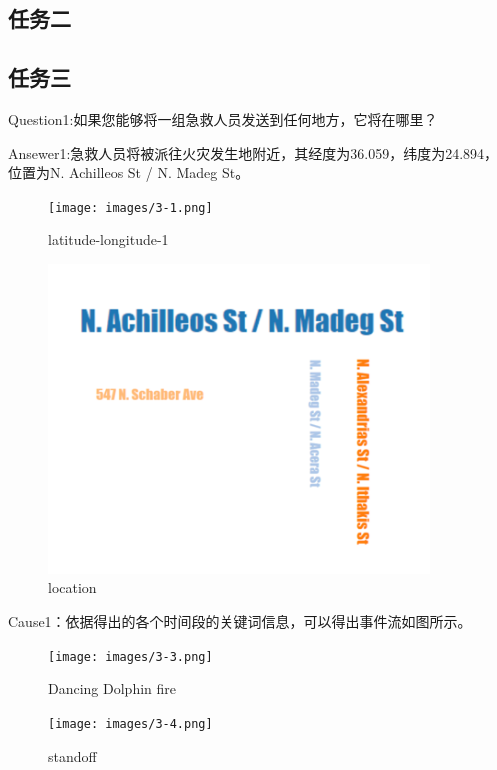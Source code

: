 \documentclass[a4paper]{article}
\begin{document}
\subsection{任务二}
\subsection{任务三}
Question1:如果您能够将一组急救人员发送到任何地方，它将在哪里？

Ansewer1:急救人员将被派往火灾发生地附近，其经度为36.059，纬度为24.894，位置为N. Achilleos St / N. Madeg St。

\begin{figure}[H]
    \centering
    \texttt{[image: images/3-1.png]}
    \caption{latitude-longitude-1}\label{fig:3-1}
    \vspace{\baselineskip}
\end{figure}

\begin{figure}[H]
  \centering
  \includegraphics[width=0.9\textwidth]{images/3-2.png}
  \caption{location}\label{fig:3-2}
  \vspace{\baselineskip}
\end{figure}

Cause1：依据得出的各个时间段的关键词信息，可以得出事件流如图所示。

\begin{figure}[H]
    \centering
    \texttt{[image: images/3-3.png]}
    \caption{Dancing Dolphin fire}\label{fig:3-3}
    \vspace{\baselineskip}
\end{figure}

\begin{figure}[H]
    \centering
    \texttt{[image: images/3-4.png]}
    \caption{standoff}\label{fig:3-4}
    \vspace{\baselineskip}
\end{figure}
\end{document}
